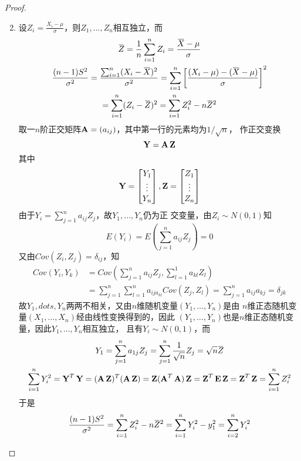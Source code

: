 \documentclass[11pt]{article}
\begin{document}
\begin{proof}
\begin{enumerate}
\setcounter{enumi}{1}
\item 设\(Z_i=\frac{X_i-\mu}{\sigma}\)，则\(Z_1,\dots,Z_n\)相互独立，而
\begin{gather*}
\bbar{Z}=\frac{1}{n}\sum_{i=1}^nZ_i=\frac{\bbar{X}-\mu}{\sigma}\\
\frac{(n-1)S^2}{\sigma^2}=\frac{\sum_{i=1}^n(X_i-\bbar{X})^2}{\sigma^2}=
\sum_{i=1}^n\left[
\frac{(X_i-\mu)-(\bbar{X}-\mu)}{\sigma}\right]^2\\
=\sum_{i=1}^n(Z_i-\bbar{Z})^2=\sum_{i=1}^nZ_i^2-n\bbar{Z}^2
\end{gather*}
取一\(n\)阶正交矩阵\(\operatorname{\textbf{A}}=(a_{ij})\)，其中第一行的元素均为\(1/\sqrt{n}\)，
作正交变换
\begin{equation*}
\operatorname{\textbf{Y}}=\operatorname{\textbf{A}}\operatorname{\textbf{Z}}
\end{equation*}
其中
\begin{equation*}
\operatorname{\textbf{Y}}=
\begin{bmatrix}
Y_1\\\vdots\\Y_n
\end{bmatrix},\operatorname{\textbf{Z}}=
\begin{bmatrix}
Z_1\\\vdots\\Z_n
\end{bmatrix}
\end{equation*}
由于\(Y_i=\displaystyle\sum_{j=1}^na_{ij}Z_j\)，故\(Y_1,\dots,Y_n\)仍为正
交变量，由\(Z_i\sim N(0,1)\)知
\begin{equation*}
E(Y_i)=E(\sum_{j=1}^na_{ij}Z_j)=0
\end{equation*}
又由\(Cov(Z_i,Z_j)=\delta_{ij}\)，知
\begin{align*}
Cov(Y_i,Y_k)&=Cov(\sum_{j=1}^na_{ij}Z_j,\sum_{l=1}^1a_{kl}Z_l)\\
&=\sum_{j=1}^n\sum_{l=1}^na_{ija_{kl}}Cov(Z_j,Z_l)=\sum_{j=1}^na_{ij}a_{kj}=\delta_{jk}
\end{align*}
故\(Y_1,dots,Y_n\)两两不相关，又由\(n\)维随机变量\((Y_1,\dots,Y_n)\)是由
\(n\)维正态随机变量\((X_1,\dots,X_n)\)经由线性变换得到的，因此
\((Y_1,\dots,Y_n)\)也是\(n\)维正态随机变量，因此\(Y_1,\dots,Y_n\)相互独立，
且有\(Y_i\sim N(0,1)\)，而
\begin{gather*}
Y_1=\sum_{j=1}^na_{1j}Z_j=\sum_{j=1}^n\frac{1}{\sqrt{n}}Z_j=\sqrt{n}\bbar{Z}\\
\sum_{i=1}^nY_i^2=\bY^T\bY=(\bA\bZ)^T(\bA\bZ)=\bZ(\bA^T\bA)\bZ=
\bZ^T\bE\bZ=\bZ^T\bZ=\sum_{i=1}^nZ_i^2
\end{gather*}
于是
\begin{equation*}
\frac{(n-1)S^2}{\sigma^2}=\sum_{i=1}^nZ_i^2-n\bbar{Z}^2=\sum_{i=1}^nY_i^2-y_1^2=
\sum_{i=2}^nY_i^2
\end{equation*}


\end{enumerate}
\end{proof}
\end{document}
